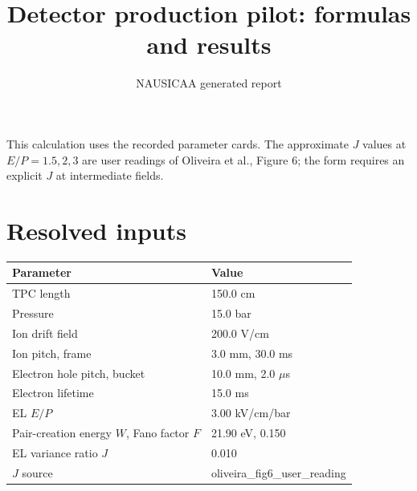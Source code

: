 \documentclass[11pt]{article}
\begin{document}
\title{Detector production pilot: formulas and results}
\author{NAUSICAA generated report}
\date{}
\maketitle
\noindent This calculation uses the recorded parameter cards. The approximate $J$ values at $E/P=1.5, 2, 3$ are user readings of Oliveira et al., Figure 6; the form requires an explicit $J$ at intermediate fields.
\section*{Resolved inputs}
\begin{tabular}{ll}\toprule Parameter & Value\\\midrule
TPC length & 150.0 cm\\
Pressure & 15.0 bar\\
Ion drift field & 200.0 V/cm\\
Ion pitch, frame & 3.0 mm, 30.0 ms\\
Electron hole pitch, bucket & 10.0 mm, 2.0 $\mu$s\\
Electron lifetime & 15.0 ms\\
EL $E/P$ & 3.00 kV/cm/bar\\
Pair-creation energy $W$, Fano factor $F$ & 21.90 eV, 0.150\\
EL variance ratio $J$ & 0.010\\
$J$ source & oliveira\_fig6\_user\_reading\\
\bottomrule\end{tabular}
\end{document}
